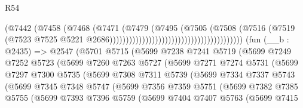 \begin{lexlean}{R54}
\begin{coremodule}
                                                                (@7442
                                                                  (@7458
                                                                    (@7468
                                                                      (@7471
                                                                        (@7479
                                                                          (@7495
                                                                            (@7505
                                                                              (@7508
                                                                                (@7516
                                                                                  (@7519
                                                                                    (@7523
                                                                                      @7525
                                                                                      @5221
                                                                                      @2686)))))))))))))))))))))))))))))))))))))))))
    (fun (__b : @2435) =>
    @2547
      (@5701
        @5715
        (@5699
          @7238
          @7241
          @5719
          (@5699
            @7249
            @7252
            @5723
            (@5699
              @7260
              @7263
              @5727
              (@5699
                @7271
                @7274
                @5731
                (@5699
                  @7297
                  @7300
                  @5735
                  (@5699
                    @7308
                    @7311
                    @5739
                    (@5699
                      @7334
                      @7337
                      @5743
                      (@5699
                        @7345
                        @7348
                        @5747
                        (@5699
                          @7356
                          @7359
                          @5751
                          (@5699
                            @7382
                            @7385
                            @5755
                            (@5699
                              @7393
                              @7396
                              @5759
                              (@5699
                                @7404
                                @7407
                                @5763
                                (@5699
                                  @7415

\end{coremodule}
\end{lexlean}
